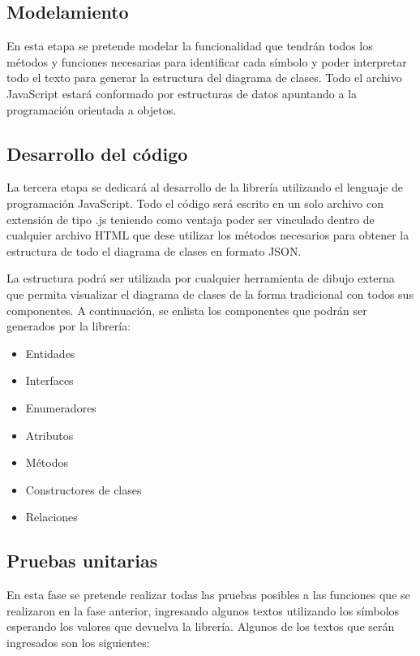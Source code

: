 \subsection{Modelamiento}

En esta etapa se pretende modelar la funcionalidad que tendrán todos los métodos y funciones necesarias para identificar cada símbolo y poder interpretar todo el texto para generar la estructura del diagrama de clases.
Todo el archivo JavaScript estará conformado por estructuras de datos apuntando a la programación orientada a objetos.

\subsection{Desarrollo del código}

La tercera etapa se dedicará al desarrollo de la librería utilizando el lenguaje de programación JavaScript. Todo el código será escrito en un solo archivo con extensión de tipo .js teniendo como ventaja poder ser vinculado dentro de cualquier archivo HTML que dese utilizar los métodos necesarios para obtener la estructura de todo el diagrama de clases en formato JSON.

La estructura podrá ser utilizada por cualquier herramienta de dibujo externa que permita visualizar el diagrama de clases de la forma tradicional con todos sus componentes. A continuación, se enlista los componentes que podrán ser generados por la librería:

\begin{itemize}
	\item Entidades
	\item Interfaces
	\item Enumeradores
	\item Atributos
	\item Métodos
	\item Constructores de clases
	\item Relaciones
\end{itemize}

\subsection{Pruebas unitarias}
En esta fase se pretende realizar todas las pruebas posibles a las funciones que se realizaron en la fase anterior, ingresando algunos textos utilizando los símbolos esperando los valores que devuelva la librería. Algunos de los textos que serán ingresados son los siguientes:

